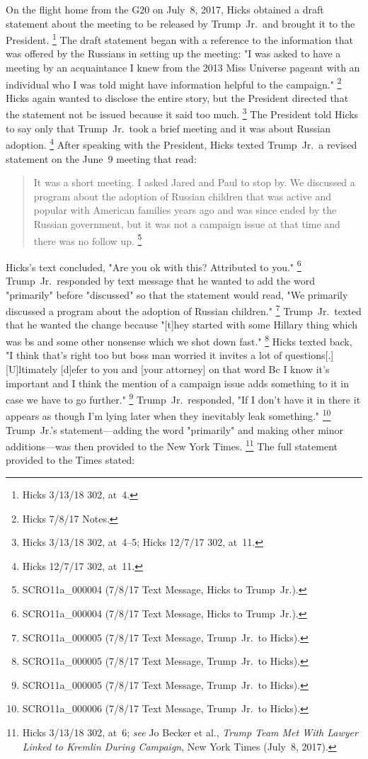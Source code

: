 On the flight home from the G20 on July~8, 2017, Hicks obtained a draft statement about the meeting to be released by Trump~Jr.\ and brought it to the President.%
\footnote{Hicks 3/13/18 302, at~4.}
The draft statement began with a reference to the information that was offered by the Russians in setting up the meeting: "I was asked to have a meeting by an acquaintance I knew from the 2013 Miss Universe pageant with an individual who I was told might have information helpful to the campaign."%
\footnote{Hicks 7/8/17 Notes.}
Hicks again wanted to disclose the entire story, but the President directed that the statement not be
issued because it said too much.%
\footnote{Hicks 3/13/18 302, at~4--5;
Hicks 12/7/17 302, at~11.}
The President told Hicks to say only that Trump~Jr.\ took a brief meeting and it was about Russian adoption.%
\footnote{Hicks 12/7/17 302, at~11.}
After speaking with the President, Hicks texted Trump~Jr.\ a revised statement on the June~9 meeting that read:

\begin{quote}
It was a short meeting.
I asked Jared and Paul to stop by.
We discussed a program about the adoption of Russian children that was active and popular with American families years ago and was since ended by the Russian government, but it was not a campaign issue at that time and there was no follow up.%
\footnote{SCRO11a\_000004 (7/8/17 Text Message, Hicks to Trump~Jr.).}
\end{quote}

Hicks's text concluded, "Are you ok with this? Attributed to you."%
\footnote{SCRO11a\_000004 (7/8/17 Text Message, Hicks to Trump~Jr.).}
Trump~Jr.\ responded by text message that he wanted to add the word "primarily" before "discussed" so that the statement would read, "We primarily discussed a program about the adoption of Russian children."%
\footnote{SCRO11a\_000005 (7/8/17 Text Message, Trump~Jr.\ to Hicks).}
Trump~Jr.\ texted that he wanted the change because "[t]hey started with some Hillary thing which was bs and some other nonsense which we shot down fast."%
\footnote{SCRO11a\_000005 (7/8/17 Text Message, Trump~Jr.\ to Hicks).}
Hicks texted back, "I think that's right too but boss man worried it invites a lot of questions[.]
[U]ltimately [d]efer to you and [your attorney] on that word Bc I know it's important and I think the mention of a campaign issue adds something to it in case we have to go further."%
\footnote{SCRO11a\_000005 (7/8/17 Text Message, Trump~Jr.\ to Hicks).}
Trump~Jr.\ responded, "If I don't have it in there it appears as though I'm lying later when they inevitably leak something."%
\footnote{SCRO11a\_000006 (7/8/17 Text Message, Trump~Jr.\ to Hicks).}
Trump~Jr.'s statement---adding the word "primarily" and making other minor additions---was then provided to the New York Times.%
\footnote{Hicks 3/13/18 302, at~6;
\textit{see} Jo Becker et al., \textit{Trump Team Met With Lawyer Linked to Kremlin During Campaign}, New York Times (July~8, 2017).}
The full statement provided to the Times stated:

